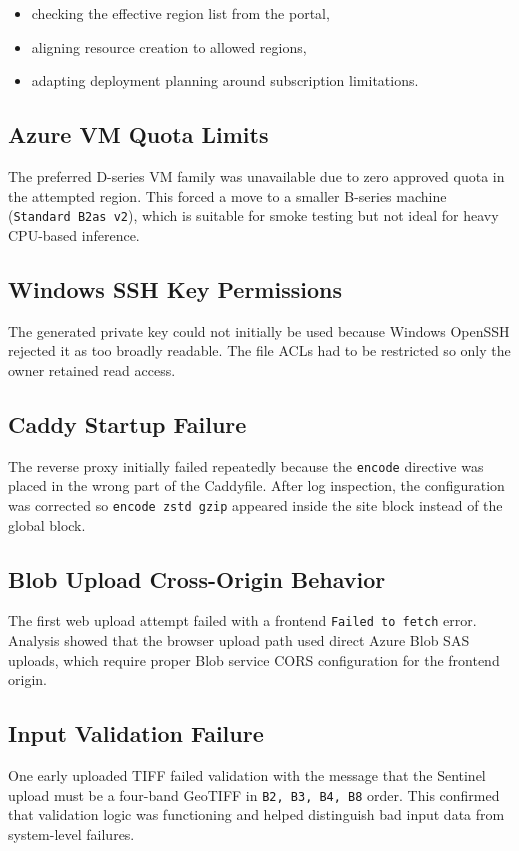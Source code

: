 \documentclass[conference]{IEEEtran}
\begin{document}
\begin{itemize}[leftmargin=16pt]
\item checking the effective region list from the portal,
\item aligning resource creation to allowed regions,
\item adapting deployment planning around subscription limitations.
\end{itemize}

\subsection{Azure VM Quota Limits}
The preferred D-series VM family was unavailable due to zero approved quota in
the attempted region. This forced a move to a smaller B-series machine
(\texttt{Standard B2as v2}), which is suitable for smoke testing but not ideal
for heavy CPU-based inference.

\subsection{Windows SSH Key Permissions}
The generated private key could not initially be used because Windows OpenSSH
rejected it as too broadly readable. The file ACLs had to be restricted so only
the owner retained read access.

\subsection{Caddy Startup Failure}
The reverse proxy initially failed repeatedly because the \texttt{encode}
directive was placed in the wrong part of the Caddyfile. After log inspection,
the configuration was corrected so \texttt{encode zstd gzip} appeared inside the
site block instead of the global block.

\subsection{Blob Upload Cross-Origin Behavior}
The first web upload attempt failed with a frontend \texttt{Failed to fetch}
error. Analysis showed that the browser upload path used direct Azure Blob SAS
uploads, which require proper Blob service CORS configuration for the frontend
origin.

\subsection{Input Validation Failure}
One early uploaded TIFF failed validation with the message that the Sentinel
upload must be a four-band GeoTIFF in \texttt{B2, B3, B4, B8} order. This
confirmed that validation logic was functioning and helped distinguish bad input
data from system-level failures.
\end{document}
